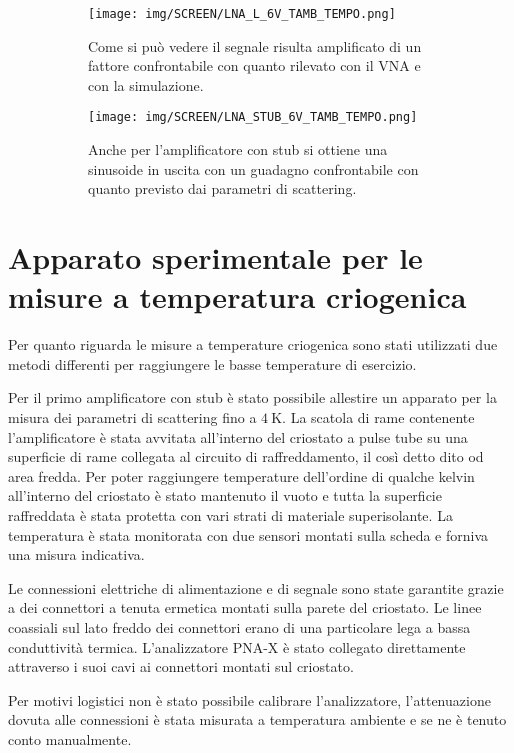 \documentclass[12pt,oneside]{book}
\begin{document}
\begin{figure}[!htbp]
    \centering
    \begin{subfigure}[t]{0.48\textwidth}
        \centering
        \texttt{[image: img/SCREEN/LNA\_L\_6V\_TAMB\_TEMPO.png]}
        \caption{Come si può vedere il segnale risulta amplificato di un fattore confrontabile con quanto rilevato con il VNA e con la simulazione.}
    \end{subfigure}
    \hfill
    \begin{subfigure}[t]{0.48\textwidth}
        \centering
        \texttt{[image: img/SCREEN/LNA\_STUB\_6V\_TAMB\_TEMPO.png]}
        \caption{Anche per l'amplificatore con stub si ottiene una sinusoide in uscita con un guadagno confrontabile con quanto previsto dai parametri di scattering.}
    \end{subfigure}
    \caption{}
    \label{time_meas}
\end{figure}


\section{Apparato sperimentale per le misure a temperatura criogenica}
Per quanto riguarda le misure a temperature criogenica sono stati utilizzati due metodi differenti per raggiungere le basse temperature di esercizio.

Per il primo amplificatore con stub è stato possibile allestire un apparato per la misura dei parametri di scattering fino a $\SI{4}{\kelvin}$. La scatola di rame contenente l'amplificatore è stata avvitata all'interno del criostato a pulse tube su una superficie di rame collegata al circuito di raffreddamento, il così detto dito od area fredda.
Per poter raggiungere temperature dell'ordine di qualche kelvin all'interno del criostato è stato mantenuto il vuoto e tutta la superficie raffreddata è stata protetta con vari strati di materiale superisolante. La temperatura è stata monitorata con due sensori montati sulla scheda e forniva una misura indicativa. 

Le connessioni elettriche di alimentazione e di segnale sono state garantite grazie a dei connettori a tenuta ermetica montati sulla parete del criostato. Le linee coassiali sul lato freddo dei connettori erano di una particolare lega a bassa conduttività termica. L'analizzatore PNA-X è stato collegato direttamente attraverso i suoi cavi ai connettori montati sul criostato.

Per motivi logistici non è stato possibile calibrare l'analizzatore, l'attenuazione dovuta alle connessioni è stata misurata a temperatura ambiente e se ne è tenuto conto manualmente.
\end{document}
